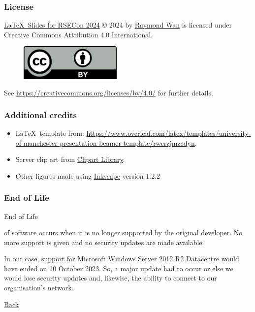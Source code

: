 \documentclass[11pt,aspectratio=43,ignorenonframetext,t]{beamer}
\begin{document}
\begin{frame}

\frametitle{License}

\vspace{1cm}
\href{https://github.com/rwanwork/Conf_RSECon_2024}{\LaTeX\ Slides for RSECon 2024} © 2024 by \href{https://www.rwanwork.info/}{Raymond Wan} is licensed under Creative Commons Attribution 4.0 International.

\begin{figure}
  \centering
  \includegraphics[width=5cm]{imgs/by}
\end{figure}

See \href{https://creativecommons.org/licenses/by/4.0/}{https://creativecommons.org/licenses/by/4.0/} for further details.

\end{frame}


\begin{frame}

\frametitle{Additional credits}

\begin{itemize}
  \item \LaTeX\ template from:  \href{https://www.overleaf.com/latex/templates/university-of-manchester-presentation-beamer-template/rwcrzjmzcdyn}{https://www.overleaf.com/latex/templates/university-of-manchester-presentation-beamer-template/rwcrzjmzcdyn}.
  \item Server clip art from \href{https://clipart-library.com/}{Clipart Library}.
  \item Other figures made using \href{https://inkscape.org/}{Inkscape} version 1.2.2
\end{itemize}

\end{frame}


\begin{frame}

\frametitle{End of Life}

\hypertarget{slide:eol}{End of Life} of software occurs when it is no longer supported by the original developer.  No more support is given and no security updates are made available.
\vs

In our case, \href{https://en.wikipedia.org/wiki/Windows\_Server\_2012\_R2}{support} for Microsoft Windows Server 2012 R2 Datacentre would have ended on 10 October 2023.  So, a major update had to occur or else we would lose security updates and, likewise, the ability to connect to our organisation's network.
\vspace{3cm}

{\hfill}{\hyperlink{slide:layered}{Back}}

\end{frame}
\end{document}
